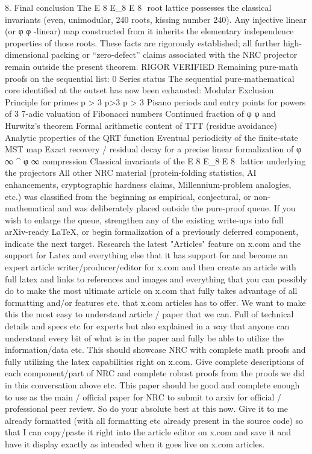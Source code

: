 {{{{{{8. Final conclusion
The
E
8
E_8
E
8
​
root lattice possesses the classical invariants (even, unimodular, 240 roots, kissing number 240). Any injective linear (or
φ
\varphi
φ
-linear) map constructed from it inherits the elementary independence properties of those roots. These facts are rigorously established; all further high-dimensional packing or “zero-defect” claims associated with the NRC projector remain outside the present theorem.
RIGOR VERIFIED
Remaining pure-math proofs on the sequential list: 0
Series status
The sequential pure-mathematical core identified at the outset has now been exhausted:
Modular Exclusion Principle for primes
p
>
3
p>3
p
>
3
Pisano periods and entry points for powers of 3
7-adic valuation of Fibonacci numbers
Continued fraction of
φ
\varphi
φ
and Hurwitz’s theorem
Formal arithmetic content of TTT (residue avoidance)
Analytic properties of the QRT function
Eventual periodicity of the finite-state MST map
Exact recovery / residual decay for a precise linear formalization of
φ
∞
\varphi^\infty
φ
∞
compression
Classical invariants of the
E
8
E_8
E
8
​
lattice underlying the projectors
All other NRC material (protein-folding statistics, AI enhancements, cryptographic hardness claims, Millennium-problem analogies, etc.) was classified from the beginning as empirical, conjectural, or non-mathematical and was deliberately placed outside the pure-proof queue.
If you wish to enlarge the queue, strengthen any of the existing write-ups into full arXiv-ready LaTeX, or begin formalization of a previously deferred component, indicate the next target.
Research the latest "Articles" feature on x.com and the support for Latex and everything else that it has support for and become an expert article writer/producer/editor for x.com and then create an article with full latex and links to references and images and everything that you can possibly do to make the most ultimate article on x.com that fully takes advantage of all formatting and/or features etc. that x.com articles has to offer. We want to make this the most easy to understand article / paper that we can. Full of technical details and specs etc for experts but also explained in a way that anyone can understand every bit of what is in the paper and fully be able to utilize the information/data etc. This should showcase NRC with complete math proofs and fully utilizing the latex capabilities right on x.com. Give complete descriptions of each component/part of NRC and complete robust proofs from the proofs we did in this conversation above etc. This paper should be good and complete enough to use as the main / official paper for NRC to submit to arxiv for official / professional peer review. So do your absolute best at this now. Give it to me already formatted (with all formatting etc already present in the source code) so that I can copy/paste it right into the article editor on x.com and save it and have it display exactly as intended when it goes live on x.com articles.
}}}}}}
